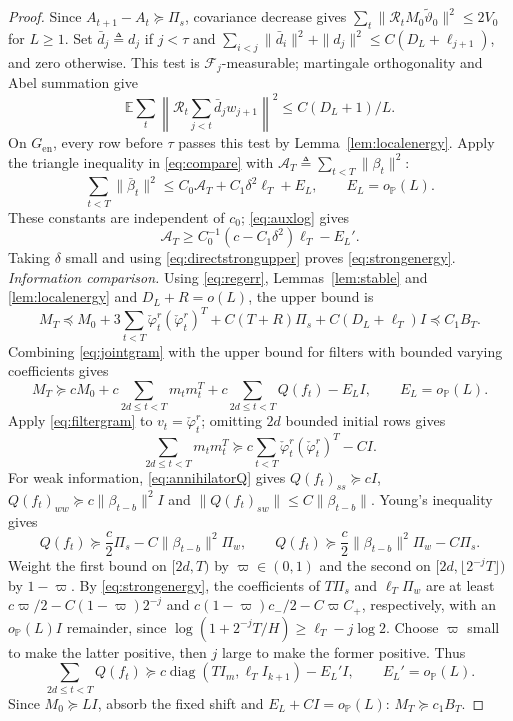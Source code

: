 \documentclass[11pt,reqno]{amsart}
\numberwithin{equation}{section}
\theoremstyle{definition}
\theoremstyle{remark}
\newcommand{\E}{\mathbb E}
\newcommand{\Prob}{\mathbb P}
\newcommand{\F}{\mathcal F}
\newcommand{\phc}{\check{\varphi}}
\newcommand{\etac}{\widetilde{\vartheta}}
\newcommand{\diag}{\operatorname{diag}}
\begin{document}
\begin{proof}
Since $A_{t+1}-A_t\succeq\Pi_s$, covariance decrease gives $\sum_t\|\mathcal R_tM_0\etac_0\|^2\le2V_0$ for $L\ge1$. Set $\bar d_j\triangleq d_j$ if $j<\tau$ and $\sum_{i<j}\|\bar d_i\|^2+\|d_j\|^2\le C(D_L+\ell_{j+1})$, and zero otherwise. This test is $\F_j$-measurable; martingale orthogonality and Abel summation give
\[
 \E\sum_t\left\|\mathcal R_t\sum_{j<t}\bar d_jw_{j+1}\right\|^2\le C(D_L+1)/L.
\]
On $G_{\mathrm{en}}$, every row before $\tau$ passes this test by Lemma~\ref{lem:localenergy}. Apply the triangle inequality in \eqref{eq:compare} with $\mathcal A_T\triangleq\sum_{t<T}\|\beta_t\|^2$:
\begin{equation*}
 \sum_{t<T}\|\bar\beta_t\|^2
 \le C_0\mathcal A_T+C_1\delta^2\ell_T+E_L,
 \qquad E_L=o_{\Prob}(L).
\end{equation*}
These constants are independent of $c_0$; \eqref{eq:auxlog} gives
\[
 \mathcal A_T\ge C_0^{-1}(c-C_1\delta^2)\ell_T-E_L'.
\]
Taking $\delta$ small and using \eqref{eq:directstrongupper} proves \eqref{eq:strongenergy}. 
\medskip\noindent\emph{Information comparison.}
Using \eqref{eq:regerr}, Lemmas~\ref{lem:stable} and \ref{lem:localenergy} and $D_L+R=o(L)$, the upper bound is
\[
 M_T\preceq M_0+3\sum_{t<T}\phc_t^r(\phc_t^r)^T
   +C(T+R)\Pi_s+C(D_L+\ell_T)I\preceq C_1B_T.
\]
Combining \eqref{eq:jointgram} with the upper bound for filters with bounded varying coefficients gives
\begin{equation*}
 M_T\succeq cM_0+c\sum_{2d\le t<T}m_tm_t^T
                +c\sum_{2d\le t<T}Q(f_t)-E_LI,
 \qquad E_L=o_{\Prob}(L).
\end{equation*}
Apply \eqref{eq:filtergram} to $v_t=\phc_t^r$; omitting $2d$ bounded initial rows gives
\[
 \sum_{2d\le t<T}m_tm_t^T
 \succeq c\sum_{t<T}\phc_t^r(\phc_t^r)^T-CI.
\]
For weak information, \eqref{eq:annihilatorQ} gives
$Q(f_t)_{ss}\succeq cI$, $Q(f_t)_{ww}\succeq c\|\beta_{t-b}\|^2I$ and
$\|Q(f_t)_{sw}\|\le C\|\beta_{t-b}\|$.
Young's inequality gives
\[
 Q(f_t)\succeq\frac c2\Pi_s-C\|\beta_{t-b}\|^2\Pi_w,
 \qquad Q(f_t)\succeq\frac c2\|\beta_{t-b}\|^2\Pi_w-C\Pi_s.
\]
Weight the first bound on $[2d,T)$ by $\varpi\in(0,1)$ and the second on $[2d,\lfloor2^{-j}T\rfloor)$ by $1-\varpi$. By \eqref{eq:strongenergy}, the coefficients of $T\Pi_s$ and $\ell_T\Pi_w$ are at least $c\varpi/2-C(1-\varpi)2^{-j}$ and $c(1-\varpi)c_-/2-C\varpi C_+$, respectively, with an $o_{\Prob}(L)I$ remainder, since $\log(1+2^{-j}T/H)\ge\ell_T-j\log2$. Choose $\varpi$ small to make the latter positive, then $j$ large to make the former positive. Thus
\[
 \sum_{2d\le t<T}Q(f_t)
 \succeq c\diag(TI_m,\ell_TI_{k+1})-E_L'I,
 \qquad E_L'=o_{\Prob}(L).
\]
Since $M_0\succeq LI$, absorb the fixed shift and $E_L+CI=o_{\Prob}(L)$: $M_T\succeq c_1B_T$. 
\end{proof}
\end{document}
